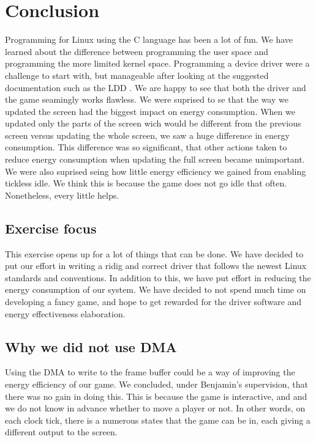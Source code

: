 \section{Conclusion}
Programming for Linux using the C language has been a lot of fun. We have learned about the difference between programming the user space and programming the more limited kernel space. Programming a device driver were a challenge to start with, but manageable after looking at the suggested documentation such as the LDD \cite{ldd}. We are happy to see that both the driver and the game seamingly works flawless. 
We were suprised to se that the way we updated the screen had the biggest impact on energy consumption. When we updated only the parts of the screen wich would be different from the previous screen versus updating the whole screen, we saw a huge difference in energy consumption. This difference was so significant, that other actions taken to reduce energy consumption when updating the full screen became unimportant. We were also suprised seing how little energy efficiency we gained from enabling tickless idle. We think this is because the game does not go idle that often. Nonetheless, every little helps.

\subsection{Exercise focus}
This exercise opens up for a lot of things that can be done. We have decided to put our effort in writing a ridig and correct driver that follows the newest Linux standards and conventions. In addition to this, we have put effort in reducing the energy consumption of our system. We have decided to not spend much time on developing a fancy game, and hope to get rewarded for the driver software and energy effectiveness elaboration. 

\subsection{Why we did not use DMA}
Using the DMA to write to the frame buffer could be a way of improving the energy efficiency of our game. We concluded, under Benjamin's supervision, that there was no gain in doing this. This is because the game is interactive, and and we do not know in advance whether to move a player or not. In other words, on each clock tick, there is a numerous states that the game can be in, each giving a different output to the screen.
